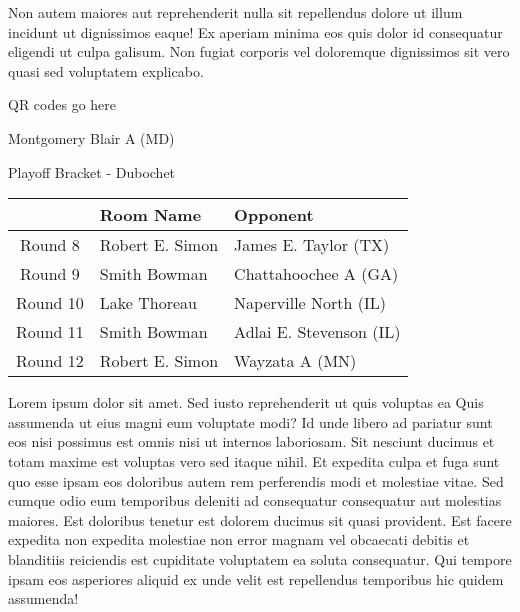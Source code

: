 \documentclass{article}%
\begin{document}
\newline%
Non autem maiores aut reprehenderit nulla sit repellendus dolore ut illum incidunt ut dignissimos eaque! Ex aperiam minima eos quis dolor id consequatur eligendi ut culpa galisum. Non fugiat corporis vel doloremque dignissimos sit vero quasi sed voluptatem explicabo.\newline%
\newline%
%
\vspace*{30pt}%
\begin{center}%
\begin{Huge}%
QR codes go here%
\end{Huge}%
\end{center}%
\newpage%
\begin{center}%
\begin{Huge}%
Montgomery Blair A (MD)%
\end{Huge}%
\vspace*{8pt}%
\linebreak%
\begin{Large}%
Playoff Bracket {-} Dubochet%
\end{Large}%
\end{center}%
\begin{tabularx}{\textwidth}{|c|Y|Y|}%
\hline%
&Room Name&Opponent\\%
\hline%
Round 8&Robert E. Simon&James E. Taylor (TX)\\%
Round 9&Smith Bowman&Chattahoochee A (GA)\\%
Round 10&Lake Thoreau&Naperville North (IL)\\%
Round 11&Smith Bowman&Adlai E. Stevenson (IL)\\%
Round 12&Robert E. Simon&Wayzata A (MN)\\%
\hline%
\end{tabularx}%
\vspace*{8pt}%
\linebreak%
\newline%
\newline%
Lorem ipsum dolor sit amet. Sed iusto reprehenderit ut quis voluptas ea Quis assumenda ut eius magni eum voluptate modi? Id unde libero ad pariatur sunt eos nisi possimus est omnis nisi ut internos laboriosam. Sit nesciunt ducimus et totam maxime est voluptas vero sed itaque nihil. Et expedita culpa et fuga sunt quo esse ipsam eos doloribus autem rem perferendis modi et molestiae vitae.\newline%
\newline%
Sed cumque odio eum temporibus deleniti ad consequatur consequatur aut molestias maiores. Est doloribus tenetur est dolorem ducimus sit quasi provident. Est facere expedita non expedita molestiae non error magnam vel obcaecati debitis et blanditiis reiciendis est cupiditate voluptatem ea soluta consequatur. Qui tempore ipsam eos asperiores aliquid ex unde velit est repellendus temporibus hic quidem assumenda!\newline%
\end{document}
